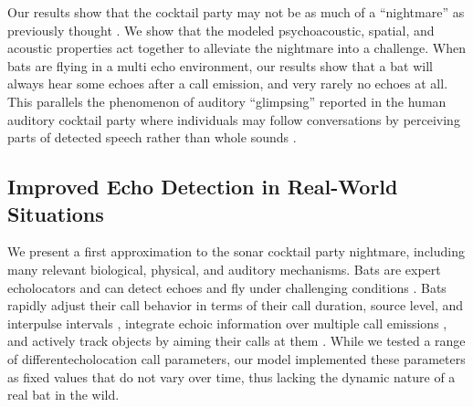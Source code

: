 \documentclass[
]{book}
\begin{document}
Our results show that the cocktail party may not be as much of a ``nightmare'' as previously thought \citep{ulanovsky2008a}. We show that the modeled psychoacoustic, spatial, and acoustic properties act together to alleviate the nightmare into a challenge. When bats are flying in a multi echo environment, our results show that a bat will always hear some echoes after a call emission, and very rarely no echoes at all. This parallels the phenomenon of auditory ``glimpsing'' reported in the human auditory cocktail party where individuals may follow conversations by perceiving parts of detected speech rather than whole sounds \citep{miller1950a}.

\hypertarget{improved-echo-detection-in-real-world-situations}{%
\subsection{Improved Echo Detection in Real-World Situations}\label{improved-echo-detection-in-real-world-situations}}

We present a first approximation to the sonar cocktail party nightmare, including many relevant biological, physical, and auditory mechanisms. Bats are expert echolocators and can detect echoes and fly under challenging conditions \citep{m1989a, surlykke1992a, petrites2009a, bates2008a}. Bats rapidly adjust their call behavior in terms of their call duration, source level, and interpulse intervals \citep{luo2017a, corcoran2017a}, integrate echoic information over multiple call emissions \citep{simmons2012a}, and actively track objects by aiming their calls at them \citep{ghose2006a, ghose2006b}. While we tested a range of differentecholocation call parameters, our model implemented these parameters as fixed values that do not vary over time, thus lacking the dynamic nature of a real bat in the wild.
\end{document}
